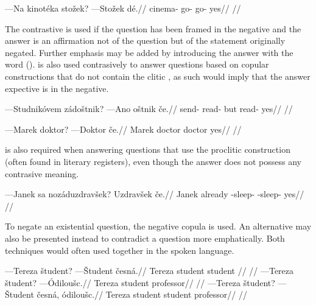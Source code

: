 \pex
\begingl
\gla ---Na kinot\'eka sto\v{z}ek? ---Sto\v{z}ek d\'e.//
\glb {} cinema- go- go- yes//
\glft {}//
\endgl
\xe

The contrastive  is used if the question has been framed in the negative and the answer  is an affirmation not of the question but of the statement originally negated. Further emphasis may be added by introducing the answer with the word  ().  is also used contrasively to answer questions based on copular constructions that do not contain the clitic , as such would imply that the answer expective is in the negative.

\pex
\begingl
\gla ---Studnik\'ovem z\'ado\v{s}tnik? ---Ano o\v{s}tnik \v{c}e.//
\glb send- read- but read- yes//
\glft {}//
\endgl
\xe

\pex
\begingl
\gla ---Marek doktor? ---Doktor \v{c}e.//
\glb Marek doctor doctor yes//
\glft {}//
\endgl
\xe

 is also required when answering questions that use the proclitic  construction (often found in literary registers), even though the answer does not possess any contrasive meaning.

\pex
\begingl
\gla ---Janek sa noz\'aduzdrav\v{s}ek? Uzdrav\v{s}ek \v{c}e.//
\glb Janek already -sleep- -sleep- yes//
\glft {}//
\endgl
\xe

To negate an existential question, the negative copula is used. An alternative may also be presented instead to contradict a question more emphatically. Both techniques would often used together in the spoken language.

\pex
\a
\begingl
\gla ---Tereza \v{s}tudent? ---\v{S}tudent \v{c}esn\'a.//
\glb Tereza student student //
\glft {}//
\endgl
\a
\begingl
\gla ---Tereza \v{s}tudent? ---\'Odilou\v{s}c.//
\glb Tereza student professor//
\glft {}//
\endgl
\a
\begingl
\gla ---Tereza \v{s}tudent? ---\v{S}tudent \v{c}esn\'a, \'odilou\v{s}c.//
\glb Tereza student student  professor//
\glft {}//
\endgl
\xe

